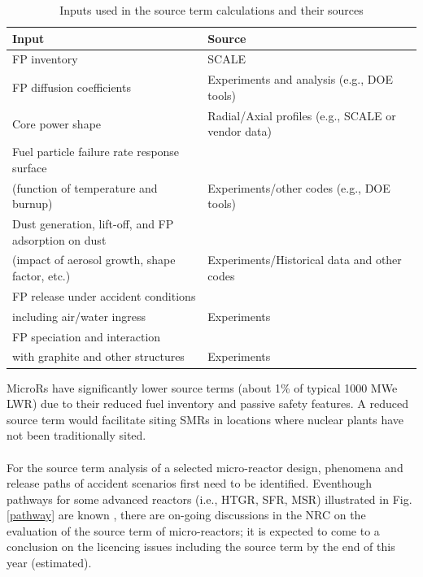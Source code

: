 \begin{table} [ht]
\begin{center}

\caption{ Inputs used in the source term calculations and their sources}
\label{inputandsource}
\begin{tabular}{l l}
\hline 
Input 		&Source \\ 
\hline 
FP inventory 		&SCALE\\ 
FP diffusion coefficients 		&Experiments and analysis (e.g., DOE tools) \\ 
Core power shape		&Radial/Axial profiles (e.g., SCALE or vendor data)  \\ 
Fuel particle failure rate response surface \\
(function of temperature and burnup)	&Experiments/other codes (e.g., DOE tools) \\ 
Dust generation, lift-off, and FP adsorption on dust \\
(impact of aerosol growth, shape factor, etc.)	& Experiments/Historical data and other codes\\ 
FP release under accident conditions \\including air/water ingress 	&Experiments \\ 
FP speciation and interaction \\with graphite and other structures &Experiments  \\ 
\hline 

\end{tabular}
\end{center}
\end{table}

MicroRs have significantly lower source terms (about 1\% of typical 1000 MWe LWR) due to their reduced fuel inventory and passive safety features. A reduced source term would facilitate siting SMRs in locations where nuclear plants have not been traditionally sited.\\\\
For the source term analysis of a selected micro-reactor design, phenomena and release paths of accident scenarios first need to be identified. Eventhough pathways for some advanced reactors (i.e., HTGR, \gls{SFR}, MSR) illustrated in Fig. \ref{pathway} are known  \cite{inl_htgr_2010}, there are on-going discussions in the NRC on the evaluation of the source term of micro-reactors; it is expected to come to a conclusion on the licencing issues including the source term by the end of this year (estimated). 


